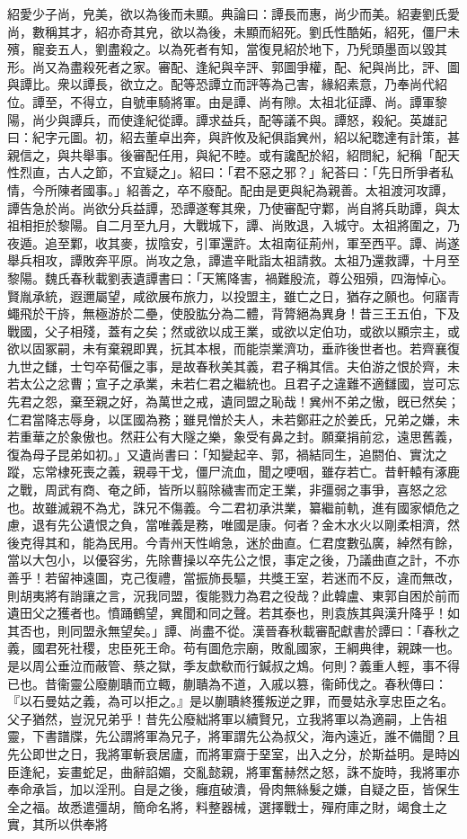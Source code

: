 \begin{pinyinscope}
紹愛少子尚，皃美，欲以為後而未顯。典論曰：譚長而惠，尚少而美。紹妻劉氏愛尚，數稱其才，紹亦奇其皃，欲以為後，未顯而紹死。劉氏性酷妬，紹死，僵尸未殯，寵妾五人，劉盡殺之。以為死者有知，當復見紹於地下，乃髠頭墨靣以毀其形。尚又為盡殺死者之家。審配、逢紀與辛評、郭圖爭權，配、紀與尚比，評、圖與譚比。衆以譚長，欲立之。配等恐譚立而評等為己害，緣紹素意，乃奉尚代紹位。譚至，不得立，自號車騎將軍。由是譚、尚有隙。太祖北征譚、尚。譚軍黎陽，尚少與譚兵，而使逢紀從譚。譚求益兵，配等議不與。譚怒，殺紀。英雄記曰：紀字元圖。初，紹去董卓出奔，與許攸及紀俱詣兾州，紹以紀聦達有計策，甚親信之，與共舉事。後審配任用，與紀不睦。或有讒配於紹，紹問紀，紀稱「配天性烈直，古人之節，不宜疑之」。紹曰：「君不惡之邪？」紀荅曰：「先日所爭者私情，今所陳者國事。」紹善之，卒不廢配。配由是更與紀為親善。太祖渡河攻譚，譚告急於尚。尚欲分兵益譚，恐譚遂奪其衆，乃使審配守鄴，尚自將兵助譚，與太祖相拒於黎陽。自二月至九月，大戰城下，譚、尚敗退，入城守。太祖將圍之，乃夜遁。追至鄴，收其麥，拔陰安，引軍還許。太祖南征荊州，軍至西平。譚、尚遂舉兵相攻，譚敗奔平原。尚攻之急，譚遣辛毗詣太祖請救。太祖乃還救譚，十月至黎陽。魏氏春秋載劉表遺譚書曰：「天篤降害，禍難殷流，尊公殂殞，四海悼心。賢胤承統，遐邇屬望，咸欲展布旅力，以投盟主，雖亡之日，猶存之願也。何寤青蠅飛於干旍，無極游於二壘，使股肱分為二體，背膂絕為異身！昔三王五伯，下及戰國，父子相殘，蓋有之矣；然或欲以成王業，或欲以定伯功，或欲以顯宗主，或欲以固冢嗣，未有棄親即異，抏其本根，而能崇業濟功，垂祚後世者也。若齊襄復九世之讎，士匄卒荀偃之事，是故春秋美其義，君子稱其信。夫伯游之恨於齊，未若太公之忿曹；宣子之承業，未若仁君之繼統也。且君子之違難不適讎國，豈可忘先君之怨，棄至親之好，為萬世之戒，遺同盟之恥哉！兾州不弟之慠，旣已然矣；仁君當降志辱身，以匡國為務；雖見憎於夫人，未若鄭莊之於姜氏，兄弟之嫌，未若重華之於象傲也。然莊公有大隧之樂，象受有鼻之封。願棄捐前忿，遠思舊義，復為母子昆弟如初。」又遺尚書曰：「知變起辛、郭，禍結同生，追閼伯、實沈之蹤，忘常棣死喪之義，親尋干戈，僵尸流血，聞之哽咽，雖存若亡。昔軒轅有涿鹿之戰，周武有商、奄之師，皆所以翦除穢害而定王業，非彊弱之事爭，喜怒之忿也。故雖滅親不為尤，誅兄不傷義。今二君初承洪業，纂繼前軌，進有國家傾危之慮，退有先公遺恨之負，當唯義是務，唯國是康。何者？金木水火以剛柔相濟，然後克得其和，能為民用。今青州天性峭急，迷於曲直。仁君度數弘廣，綽然有餘，當以大包小，以優容劣，先除曹操以卒先公之恨，事定之後，乃議曲直之計，不亦善乎！若留神遠圖，克己復禮，當振斾長驅，共獎王室，若迷而不反，違而無改，則胡夷將有誚讓之言，況我同盟，復能戮力為君之役哉？此韓盧、東郭自困於前而遺田父之獲者也。憤踊鶴望，兾聞和同之聲。若其泰也，則袁族其與漢升降乎！如其否也，則同盟永無望矣。」譚、尚盡不從。漢晉春秋載審配獻書於譚曰：「春秋之義，國君死社稷，忠臣死王命。苟有圖危宗廟，敗亂國家，王綱典律，親踈一也。是以周公垂泣而蔽管、蔡之獄，季友歔欷而行鍼叔之鴆。何則？義重人輕，事不得已也。昔衞靈公廢蒯聵而立輙，蒯聵為不道，入戚以篡，衞師伐之。春秋傳曰：『以石曼姑之義，為可以拒之。』是以蒯聵終獲叛逆之罪，而曼姑永享忠臣之名。父子猶然，豈況兄弟乎！昔先公廢絀將軍以續賢兄，立我將軍以為適嗣，上告祖靈，下書譜牒，先公謂將軍為兄子，將軍謂先公為叔父，海內遠近，誰不備聞？且先公即世之日，我將軍斬衰居廬，而將軍齋于堊室，出入之分，於斯益明。是時凶臣逢紀，妄畫蛇足，曲辭諂媚，交亂懿親，將軍奮赫然之怒，誅不旋時，我將軍亦奉命承旨，加以淫刑。自是之後，癰疽破潰，骨肉無絲髮之嫌，自疑之臣，皆保生全之福。故悉遣彊胡，簡命名將，料整器械，選擇戰士，殫府庫之財，竭食土之實，其所以供奉將
\end{pinyinscope}
